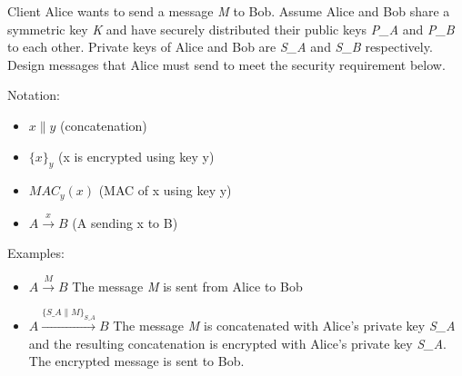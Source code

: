 \documentclass[addpoints,answers]{exam}
\begin{document}
\begin{questions}

\pagebreak


Client Alice wants to send a message \textit{M} to Bob. Assume Alice
and Bob share a symmetric key \textit{K} and have securely distributed
their public keys \textit{P\_A} and \textit{P\_B} to each
other. Private keys of Alice and Bob are \textit{S\_A} and
\textit{S\_B} respectively. Design messages that Alice must send to
meet the security requirement below.

Notation: 
\begin{itemize}
\item $x \parallel y$ (concatenation) 
\item $\{x\}_y$ (x is encrypted using key y) 
\item $MAC_y(x)$ (MAC of x using key y) 
\item $A \xrightarrow{x} B$ (A sending x to B)
\end{itemize}

Examples:
\begin{itemize}
\item $A \xrightarrow{M} B$ The message \textit{M} is sent from Alice to Bob
\item $A \xrightarrow{\{S\_A \parallel M\}_{S\_A}} B$ The message
  \textit{M} is concatenated with Alice's private key \textit{S\_A}
  and the resulting concatenation is encrypted with Alice's private
  key \textit{S\_A}. The encrypted message is sent to Bob.
\end{itemize}


\end{questions}
\end{document}
